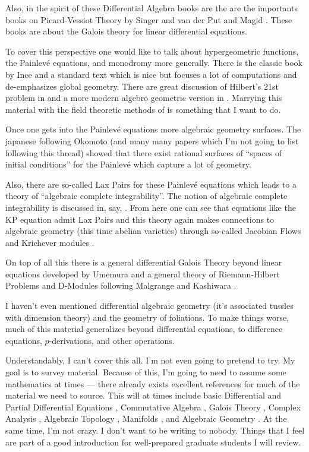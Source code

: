 \documentclass[]{book}
\numberwithin{equation}{section}
\theoremstyle{definition}
\theoremstyle{remark}
\begin{document}
Also, in the spirit of these Differential Algebra books are the are the importants books on Picard-Vessiot Theory by Singer and van der Put \cite{Put2003} and Magid \cite{Magid1994}.
These books are about the Galois theory for linear differential equations.

To cover this perspective one would like to talk about hypergeometric functions, the Painlev\'{e} equations, and monodromy more generally. 
There is the classic book by Ince \cite{Ince1944} and a standard text \cite{Iwasaki1991} which is nice but focuses a lot of computations and de-emphasizes global geometry.
There are great discussion of Hilbert's 21st problem in \cite{Borel1987} and a more modern algebro geometric version in \cite{Deligne1970}.
Marrying this material with the field theoretic methods of \cite{Buium1986} is something that I want to do. 

Once one gets into the Painlev\'{e} equations more algebraic geometry surfaces. The japanese following  Okomoto \cite{Okamoto1987b,Okamoto1987,Okamoto1986, Okamoto1987a} (and many many papers which I'm not going to list following this thread) showed that there exist rational surfaces of ``spaces of initial conditions'' for the Painlev\'{e} which capture a lot of geometry. 

Also, there are so-called Lax Pairs for these Painlev\'{e} equations which leads to a theory of ``algebraic complete integrability''. 
The notion of algebraic complete integrability is discussed in, say, \cite{Beauville1990}\cite{Adler2004}. 
From here one can see that equations like the KP equation admit Lax Pairs and this theory again makes connections to algebraic geometry (this time abelian varieties) through so-called Jacobian Flows and Krichever modules \cite{Mulase1994}.

On top of all this there is a general differential Galois Theory beyond linear equations  developed by Umemura \cite{Umemura2011} and a general theory of Riemann-Hilbert  Problems and D-Modules following Malgrange and Kashiwara \cite{Borel1987}.

I haven't even mentioned differential algebraic geometry (it's associated tussles with dimension theory) and the geometry of foliations. To make things worse, much of this material generalizes beyond differential equations, to difference equations, $p$-derivations, and other operations.

Understandably, I can't cover this all. 
I'm not even going to pretend to try. 
My goal is to survey material.
Because of this, I'm going to need to assume some mathematics at times --- there already exists excellent references for much of the material we need to source.  
This will at times include basic Differential \cite{Ince1944} and Partial Differential Equations \cite{Evans2010}, Commutative Algebra \cite{Atiyah2016}, Galois Theory \cite{Cox2012}, Complex Analysis \cite{Ullrich2008}, Algebraic Topology \cite{Hatcher2002}, Manifolds \cite{Lee2013}, and Algebraic Geometry \cite{Vakil2017}. 
At the same time, I'm not crazy. 
I don't want to be writing to nobody. 
Things that I feel are part of a good introduction for well-prepared graduate students I will review. 
\end{document}
